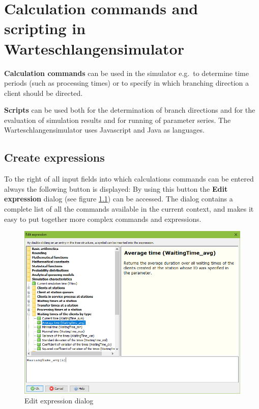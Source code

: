 \chapter{Calculation commands and scripting in Warteschlangensimulator}

\renewcommand{\thepage}{\arabic{page}}
\setcounter{page}{1}

\textbf{Calculation commands} can be used in the simulator e.g.\ to determine time periods
(such as processing times) or to specify in which branching direction a client should be directed.

\textbf{Scripts} can be used both for the determination of branch directions and for the evaluation
of simulation results and for running of parameter series. The Warteschlangensimulator uses
Javascript and Java as languages.



\section{Create expressions}

To the right of all input fields into which calculations commands can be entered
always the following button is displayed:
By using this button the \textbf{Edit expression} dialog
(see figure \ref{fig:ExpressionBuilder}) can be accessed.
The dialog contains a complete list of all the commands available
in the current context, and makes it easy to put together
more complex commands and expressions.

\begin{figure}[ht]	
	\caption{Edit expression dialog}
	\centerline{\includegraphics[width=14cm]{DialogExpressionBuilder.png}}
	\label{fig:ExpressionBuilder}
\end{figure}
